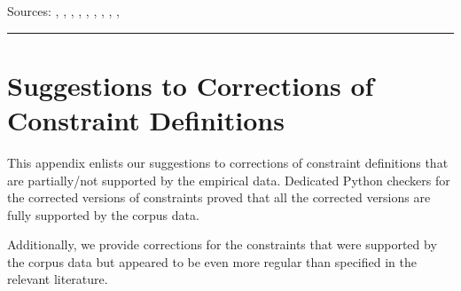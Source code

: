 \documentclass[10pt, a4paper]{article}
\begin{document}
\noindent
Sources: \citet[226]{eisenberg_2013}, \citet[569]{fuhrhop_kuerschner_2015}, \citet[177]{kopf_2017}, \citet[3]{krott_etal_2007}, \citet[107]{kuerschner_2005}, \citet[150, 156]{libben_etal_2009}, \citet[2]{nuebling_szczepaniak_2008}, \citet[50, 52, 54, 103]{ortner_mueller-bollhagen_1991}, \citet[8, 9]{schaefer_pankratz_2018}, \citet[9]{schluecker_2012}

\vspace{0.35em}
\hrule






\section{Suggestions to Corrections of Constraint Definitions}
\label{constraint_corrs}

This appendix enlists our suggestions to corrections of constraint definitions that are partially/not supported by the empirical data. Dedicated Python checkers for the corrected versions of constraints proved that all the corrected versions are fully supported by the corpus data. 



\vspace{1.5em}

Additionally, we provide corrections for the constraints that were supported by the corpus data but appeared to be even more regular than specified in the relevant literature.


\end{document}
